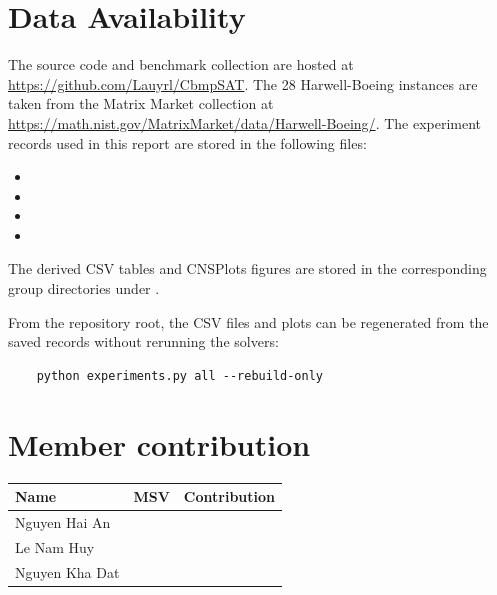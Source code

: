 \documentclass[a4paper,fleqn]{cas-sc}
\begin{document}
\section*{Data Availability}
    The source code and benchmark collection are hosted at \url{https://github.com/Lauyrl/CbmpSAT}. The 28 Harwell-Boeing instances are taken from the Matrix Market collection at \url{https://math.nist.gov/MatrixMarket/data/Harwell-Boeing/}. The experiment records used in this report are stored in the following files:
    \begin{itemize}
    \item {}
    \item {}
    \item {}
    \item {}
    \end{itemize}
    The derived CSV tables and CNSPlots figures are stored in the corresponding group directories under .

    From the repository root, the CSV files and plots can be regenerated from the saved records without rerunning the solvers:
    \begin{verbatim}
    python experiments.py all --rebuild-only
    \end{verbatim}

\section*{Member contribution}

    \begin{center}
    \begin{tabular}{lll}
    \toprule
    \textbf{Name} & \textbf{MSV} & \textbf{Contribution} \\
    \midrule
    Nguyen Hai An & & \\
    Le Nam Huy & & \\
    Nguyen Kha Dat & & \\
    \bottomrule
    \end{tabular}
    \end{center}
\end{document}
